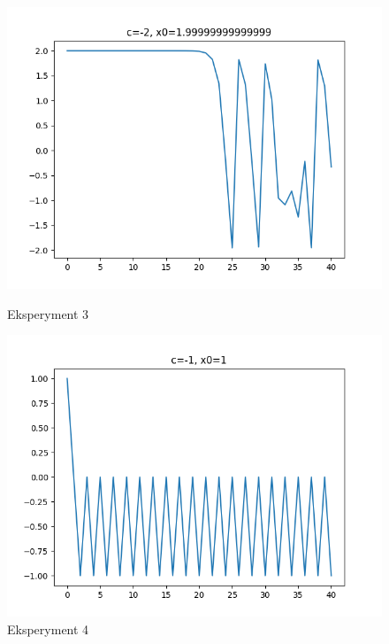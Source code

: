 \documentclass[12pt]{article}
\begin{document}
\newpage
\begin{figure}[!htb]
  \includegraphics[width=\linewidth]{3.png}
  \caption{Eksperyment 3}
\endminipage\hfill
{}
  \includegraphics[width=\linewidth]{4.png}
  \caption{Eksperyment 4}
\endminipage
\end{figure}
\end{document}
